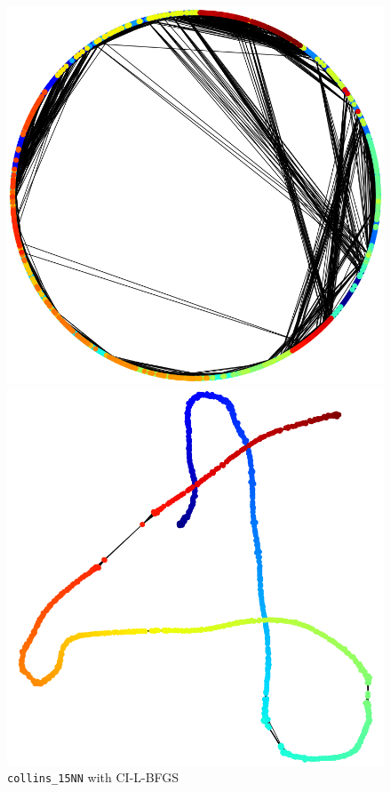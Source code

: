 \documentclass[dvipdfmx,10pt,journal,compsoc]{IEEEtran}
\begin{document}
\begin{figure}[t]
  \centering
  \begin{minipage}{0.49\columnwidth}
    \centering
    \includegraphics[width=\columnwidth]{circle/vis/collins_15NN_CI-L-BFGS_50_first.png}
  \end{minipage}
  \begin{minipage}{0.49\columnwidth}
    \centering
    \includegraphics[width=\columnwidth]{circle/vis/collins_15NN_CI-L-BFGS_50_last.png}
  \end{minipage}
  \caption{\texttt{collins\_15NN} with \textsf{CI-L-BFGS}}
  \label{fig:collins_15NN_CI}
\end{figure}
\end{document}
